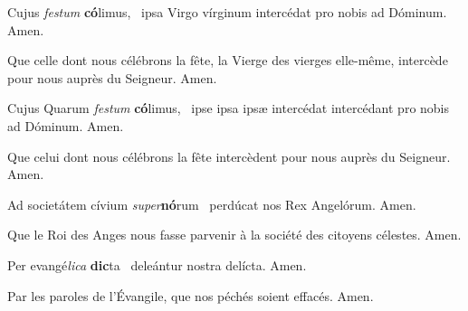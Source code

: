 \documentclass[psautier_nocturne_fr.tex]{subfiles}
\begin{document}
\begin{paracol}{2}

Cujus \textit{festum} \textbf{có}limus,~\GreSpecial{*}
ipsa Virgo vírginum intercédat pro nobis ad Dóminum.
\hspace{\specialcharhsep}\rr Amen.

\switchcolumn

Que celle dont nous célébrons la fête, la Vierge des vierges elle-même, intercède pour nous auprès du Seigneur.
\hspace{\specialcharhsep}\rr Amen.

\end{paracol}


\begin{paracol}{2}

Cujus  Quarum\rubric{)} \textit{festum} \textbf{có}limus,~\GreSpecial{*}
ipse  ipsa  ipsæ\rubric{)}
intercédat  intercédant\rubric{)} pro nobis ad Dóminum.
\hspace{\specialcharhsep}\rr Amen.

\switchcolumn

Que celui  dont nous célébrons la fête intercède\rubric{(}nt\rubric{)} pour nous auprès du Seigneur.
\hspace{\specialcharhsep}\rr Amen.

\end{paracol}

\begin{paracol}{2}

Ad societátem cívium \textit{super}\textbf{nó}rum~\GreSpecial{*}
perdúcat nos Rex Angelórum.
\hspace{\specialcharhsep}\rr Amen.

\switchcolumn

Que le Roi des Anges nous fasse parvenir à la société des citoyens célestes.
\hspace{\specialcharhsep}\rr Amen.

\end{paracol}


\begin{paracol}{2}

Per evangé\textit{lica} \textbf{dic}ta~\GreSpecial{*}
deleántur nostra delícta.
\hspace{\specialcharhsep}\rr Amen.

\switchcolumn

Par les paroles de l'Évangile, que nos péchés soient effacés.
\hspace{\specialcharhsep}\rr Amen.

\end{paracol}
\end{document}
